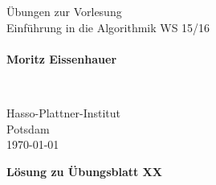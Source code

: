 \documentclass{scrartcl}
\begin{document}
\pagestyle{plain}


\noindent
\begin{minipage}{0.66\textwidth}
Übungen zur Vorlesung\\
Einführung in die Algorithmik WS 15/16\\
~\\
\textbf{Moritz Eissenhauer}
\end{minipage}
~
\begin{minipage}{0.30\textwidth}
Hasso-Plattner-Institut\\
Potsdam\\
\today
\end{minipage}


\begin{center}
 \huge \bf Lösung zu Übungsblatt XX
\end{center}
\end{document}
